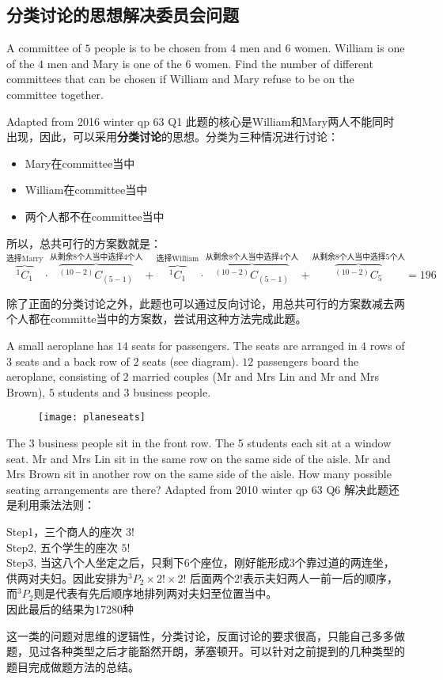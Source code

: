 \subsection*{分类讨论的思想解决委员会问题}
\begin{ExampleBox}
A committee of $5$ people is to be chosen from $4$ men and $6$ women. William is one of the $4$ men and Mary is one of the $6$ women. Find the number of different committees that can be chosen if William and Mary refuse to be on the committee together.


\makebox{}\hfill Adapted from 2016 winter qp 63 Q1
\tcblower
此题的核心是William和Mary两人不能同时出现，因此，可以采用\textbf{分类讨论}的思想。分类为三种情况进行讨论：
\begin{itemize}
	\item Mary在committee当中
	\item William在committee当中
	\item 两个人都不在committee当中
\end{itemize}
所以，总共可行的方案数就是：
\[
	\overbrace{^1C_1}^{\text{选择Marry}}\cdot \overbrace{^{(10-2)}C_{(5-1)}}^{\text{从剩余8个人当中选择4个人}} + \overbrace{^1C_1}^{\text{选择William}}\cdot \overbrace{^{(10-2)}C_{(5-1)}}^{\text{从剩余8个人当中选择4个人}}+\overbrace{^{(10-2)}C_{5}}^{\text{从剩余8个人当中选择5个人}} = 196
\]
\end{ExampleBox}

\begin{TaskBox}
除了正面的分类讨论之外，此题也可以通过反向讨论，用总共可行的方案数减去两个人都在committe当中的方案数，尝试用这种方法完成此题。
\end{TaskBox}


\begin{ExampleBox}
A small aeroplane has $14$ seats for passengers. The seats are arranged in $4$ rows of $3$ seats and a back row of $2$ seats (see diagram). $12$ passengers board the aeroplane, consisting  of $2$ married couples (Mr and Mrs Lin and Mr and Mrs Brown), $5$ students and $3$ business people.
\begin{figure}[H]
\centering
\texttt{[image: planeseats]}
\end{figure}
The $3$ business people sit in the front row. The $5$ students each sit at a window seat. Mr and Mrs Lin sit in the same row on the same side of the aisle. Mr and Mrs Brown sit in another row on the same side of the aisle. How many possible seating arrangements are there?
\makebox{}\hfill Adapted from 2010 winter qp 63 Q6
\tcblower
解决此题还是利用乘法法则：

Step1，三个商人的座次 $3!$\\
Step2, 五个学生的座次 $5!$\\
Step3, 当这八个人坐定之后，只剩下6个座位，刚好能形成3个靠过道的两连坐，供两对夫妇。因此安排为$^3P_2\times 2! \times 2!$ 后面两个$2!$表示夫妇两人一前一后的顺序，而$^3P_2$则是代表有先后顺序地排列两对夫妇至位置当中。\\

因此最后的结果为17280种
\end{ExampleBox}

\begin{SummBox}
这一类的问题对思维的逻辑性，分类讨论，反面讨论的要求很高，只能自己多多做题，见过各种类型之后才能豁然开朗，茅塞顿开。可以针对之前提到的几种类型的题目完成做题方法的总结。
\end{SummBox}
